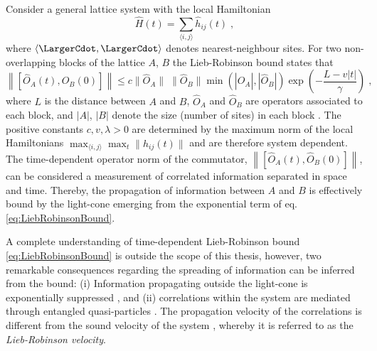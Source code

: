 Consider a general lattice system with the local Hamiltonian
\begin{equation}
	\hat{H} (t) = \sum_{\langle i,j \rangle} \hat{h}_{ij}(t) \; ,
\end{equation}
where $\langle \LargerCdot , \LargerCdot \rangle$ denotes nearest-neighbour sites. For two non-overlapping blocks of the lattice $A$, $B$ the Lieb-Robinson bound states that
\begin{equation}
	\left\lVert \left[ \hat{O}_A (t) , \hat{O}_B (0) \right] \right\rVert \leq c \lVert \hat{O}_A \rVert \; \lVert \hat{O}_B \rVert
	\min \left( | \hat{O}_A | , | \hat{O}_B | \right) \exp \left(-  \frac{L - v |t|}{\gamma} \right) \; ,
	\label{eq:LiebRobinsonBound}
\end{equation}
where $L$ is the distance between $A$ and $B$, $\hat{O}_A$ and $\hat{O}_B $ are operators associated to each block, and $| A |$, $| B |$ denote the size (number of sites) in each block \cite{Bravyi2006}. The positive constants $c,v,\lambda > 0$ are determined by the maximum norm of the local Hamiltonians $\max_{\langle i,j \rangle} \max_{t}  \lVert \hat{h}_{ij} (t) \rVert $ and are therefore system dependent. The time-dependent operator norm of the commutator, $\left\lVert \left[ \hat{O}_A (t) , \hat{O}_B (0) \right] \right\rVert$, can be considered a measurement of correlated information separated in space and time. Thereby, the propagation of information between $A$ and $B$ is effectively bound by the light-cone emerging from the exponential term of eq. \eqref{eq:LiebRobinsonBound}.

A complete understanding of time-dependent Lieb-Robinson bound \eqref{eq:LiebRobinsonBound} is outside the scope of this thesis, however, two remarkable consequences regarding the spreading of information can be inferred from the bound: (i) Information propagating outside the light-cone is exponentially suppressed \cite{Bravyi2006}, and (ii) correlations within the system are mediated through entangled quasi-particles \cite{Cheneau2012}. The propagation velocity of the correlations is different from the sound velocity of the system \cite{Lauchli2008}, whereby it is referred to as the \textit{Lieb-Robinson velocity}.

